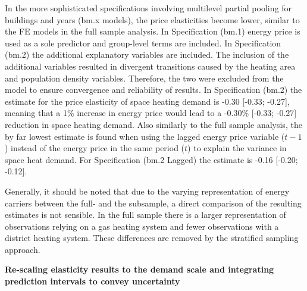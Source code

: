 \documentclass[12pt,twoside]{reedthesis}
\begin{document}
In the more sophisticated specifications involving multilevel partial pooling for buildings and years (bm.x models), the price elasticities become lower, similar to the FE models in the full sample analysis. In Specification (bm.1) energy price is used as a sole predictor and group-level terms are included. In Specification (bm.2) the additional explanatory variables are included. The inclusion of the additional variables resulted in divergent transitions caused by the heating area and population density variables. Therefore, the two were excluded from the model to ensure convergence and reliability of results. In Specification (bm.2) the estimate for the price elasticity of space heating demand is -0.30 {[}-0.33; -0.27{]}, meaning that a 1\% increase in energy price would lead to a -0.30\% {[}-0.33; -0.27{]} reduction in space heating demand. Also similarly to the full sample analysis, the by far lowest estimate is found when using the lagged energy price variable (\(t-1\)) instead of the energy price in the same period (\(t\)) to explain the variance in space heat demand. For Specification (bm.2 Lagged) the estimate is -0.16 {[}-0.20; -0.12{]}.

Generally, it should be noted that due to the varying representation of energy carriers between the full- and the subsample, a direct comparison of the resulting estimates is not sensible. In the full sample there is a larger representation of observations relying on a gas heating system and fewer observations with a district heating system. These differences are removed by the stratified sampling approach.

\textbf{Re-scaling elasticity results to the demand scale and integrating prediction intervals to convey uncertainty}
\end{document}
